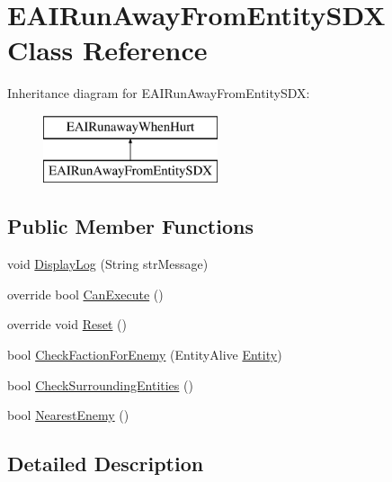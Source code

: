 \hypertarget{class_e_a_i_run_away_from_entity_s_d_x}{}\section{E\+A\+I\+Run\+Away\+From\+Entity\+S\+DX Class Reference}
\label{class_e_a_i_run_away_from_entity_s_d_x}
Inheritance diagram for E\+A\+I\+Run\+Away\+From\+Entity\+S\+DX\+:\begin{figure}[H]
\begin{center}
\leavevmode
\includegraphics[height=2.000000cm]{class_e_a_i_run_away_from_entity_s_d_x}
\end{center}
\end{figure}
\subsection*{Public Member Functions}
\begin{DoxyCompactItemize}
\item 
void \mbox{\hyperlink{class_e_a_i_run_away_from_entity_s_d_x_a9e3ef2d95c8b095197fa92a9bb3b7bc5}{Display\+Log}} (String str\+Message)
\item 
override bool \mbox{\hyperlink{class_e_a_i_run_away_from_entity_s_d_x_ace930c70cc6973736efd632ad966b92f}{Can\+Execute}} ()
\item 
override void \mbox{\hyperlink{class_e_a_i_run_away_from_entity_s_d_x_a0aed936e205eb5f5634ece8528f61f95}{Reset}} ()
\item 
bool \mbox{\hyperlink{class_e_a_i_run_away_from_entity_s_d_x_a86965636a2bda1137c97d41e9e37de0e}{Check\+Faction\+For\+Enemy}} (Entity\+Alive \mbox{\hyperlink{_the_01_restless_01_curse_2_config_2_localization_8txt_a831452d5736d8c492ddd792b09c12cde}{Entity}})
\item 
bool \mbox{\hyperlink{class_e_a_i_run_away_from_entity_s_d_x_a1fe2c1086cb2d9322073487899de210d}{Check\+Surrounding\+Entities}} ()
\item 
bool \mbox{\hyperlink{class_e_a_i_run_away_from_entity_s_d_x_afc6aef51395f4c9f826a00b89e330165}{Nearest\+Enemy}} ()
\end{DoxyCompactItemize}


\subsection{Detailed Description}


